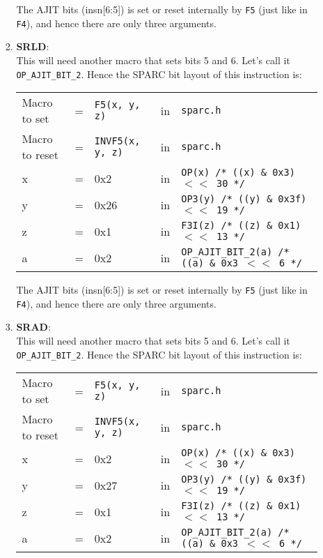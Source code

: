 \begin{itemize}
\begin{enumerate}
\begin{enumerate}
      The AJIT bits (insn[6:5]) is  set or reset internally by \texttt{F5}
      (just  like  in  \texttt{F4}),  and   hence  there  are  only  three
      arguments.

    \item \textbf{SRLD}:\\
      This will need another macro that sets bits 5 and 6. Let's call it
      \texttt{OP\_AJIT\_BIT\_2}.   Hence the  SPARC bit  layout of  this
      instruction is:

      \begin{tabular}[h]{lclcl}
        Macro to set  &=& \texttt{F5(x, y, z)} &in& \texttt{sparc.h}     \\
        Macro to reset  &=& \texttt{INVF5(x, y, z)} &in& \texttt{sparc.h}     \\
        x &=& 0x2      &in& \texttt{OP(x)  /* ((x) \& 0x3)  $<<$ 30 */} \\
        y &=& 0x26     &in& \texttt{OP3(y) /* ((y) \& 0x3f) $<<$ 19 */} \\
        z &=& 0x1      &in& \texttt{F3I(z) /* ((z) \& 0x1)  $<<$ 13 */} \\
        a &=& 0x2      &in& \texttt{OP\_AJIT\_BIT\_2(a) /* ((a) \& 0x3  $<<$ 6 */}
      \end{tabular}

      The AJIT bits (insn[6:5]) is  set or reset internally by \texttt{F5}
      (just  like  in  \texttt{F4}),  and   hence  there  are  only  three
      arguments.
      
    \item \textbf{SRAD}:\\
      This will need another macro that sets bits 5 and 6. Let's call it
      \texttt{OP\_AJIT\_BIT\_2}.   Hence the  SPARC bit  layout of  this
      instruction is:

      \begin{tabular}[h]{lclcl}
        Macro to set  &=& \texttt{F5(x, y, z)} &in& \texttt{sparc.h}     \\
        Macro to reset  &=& \texttt{INVF5(x, y, z)} &in& \texttt{sparc.h}     \\
        x &=& 0x2      &in& \texttt{OP(x)  /* ((x) \& 0x3)  $<<$ 30 */} \\
        y &=& 0x27     &in& \texttt{OP3(y) /* ((y) \& 0x3f) $<<$ 19 */} \\
        z &=& 0x1      &in& \texttt{F3I(z) /* ((z) \& 0x1)  $<<$ 13 */} \\
        a &=& 0x2      &in& \texttt{OP\_AJIT\_BIT\_2(a) /* ((a) \& 0x3  $<<$ 6 */}
      \end{tabular}


\end{enumerate}
\end{enumerate}
\end{itemize}
